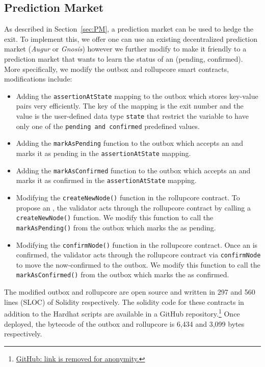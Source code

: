 \subsection{Prediction Market}
As described in Section~\ref{sec:PM}, a prediction market can be used to hedge the exit. To implement this, we offer one can use an existing decentralized prediction market (\eg \textit{Augur} or \textit{Gnosis}) however we further modify \arb \nitro to make it friendly to a prediction market that wants to learn the status of an \rblock (pending, confirmed). More specifically, we modify the \arb \nitro outbox and rollupcore smart contracts, modifications include:

\begin{itemize}
\item Adding the \texttt{assertionAtState} mapping to the outbox which stores key-value pairs very efficiently. The key of the mapping is the exit number and the value is the user-defined data type \texttt{state} that restrict the variable to have only one of the \texttt{pending and confirmed} predefined values.
\item Adding the \texttt{markAsPending} function to the outbox which accepts an \rblock and marks it as pending in the \texttt{assertionAtState} mapping.
\item Adding the \texttt{markAsConfirmed} function to the outbox which accepts an \rblock and marks it as confirmed in the \texttt{assertionAtState} mapping.
\item Modifying the \texttt{createNewNode()} function in the rollupcore contract. To propose an \rblock, the validator acts through the rollupcore contract by calling a \texttt{createNewNode()} function. We modify this function to call the \texttt{markAsPending()} from the outbox which marks the \rblock as pending.
\item Modifying the \texttt{confirmNode()} function in the rollupcore contract. Once an \rblock is confirmed, the validator acts through the rollupcore contract via \texttt{confirmNode} to move the now-confirmed \rblock to the outbox. We modify this function to call the \texttt{markAsConfirmed()} from the outbox which marks the \rblock as confirmed.
\end{itemize}

The modified outbox and rollupcore are open source and written in 297 and 560  lines (SLOC) of Solidity respectively. The solidity code for these contracts in addition to the Hardhat scripts are available in a GitHub repository.\footnote{\href{https://}{GitHub: link is removed for anonymity.}} Once deployed, the bytecode of the outbox and rollupcore is 6,434 and 3,099 bytes respectively.




